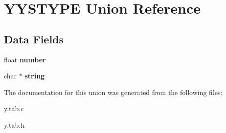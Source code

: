 \hypertarget{union_y_y_s_t_y_p_e}{
\section{YYSTYPE Union Reference}
\label{union_y_y_s_t_y_p_e}
}
\subsection*{Data Fields}
\begin{DoxyCompactItemize}
\item 
\hypertarget{union_y_y_s_t_y_p_e_a21d340fd1a7a9978644b6eeb2c624484}{
float {\bfseries number}}
\label{union_y_y_s_t_y_p_e_a21d340fd1a7a9978644b6eeb2c624484}

\item 
\hypertarget{union_y_y_s_t_y_p_e_ade5564eae6cc31b285dd98c1f926c8f2}{
char $\ast$ {\bfseries string}}
\label{union_y_y_s_t_y_p_e_ade5564eae6cc31b285dd98c1f926c8f2}

\end{DoxyCompactItemize}


The documentation for this union was generated from the following files:\begin{DoxyCompactItemize}
\item 
y.tab.c\item 
y.tab.h\end{DoxyCompactItemize}
